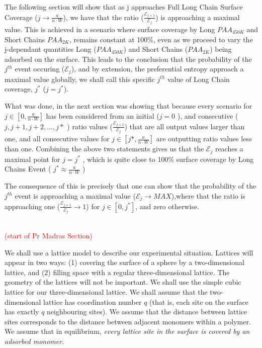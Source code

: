\documentclass[journal=jacsat,manuscript=article]{achemso}
\begin{document}
The following section will show that as j approaches Full Long Chain Surface Coverage ($j\to \frac{a}{n\cdot W}$), we have that the ratio ($\frac{\mathcal{E}_{j+1}}{\mathcal{E}_{j}}$) is approaching a maximal value. This is achieved in a scenario where surface coverage by Long $PAA_{450K}$ and Short Chains $PAA_{2K}$, remains constant at 100\%, even as we proceed to vary the j-dependant quantities Long ($PAA_{450K}$) and Short Chains ($PAA_{2K}$) being adsorbed on the surface. This leads to the conclusion that the probability of the $j^{th}$ event occuring ($\mathcal{E}_{j}$), and by extension, the preferential entropy approach a maximal value globally, we shall call this specific $j^{th}$ value of Long Chain coverage, $j^*$ ($j=j^{*}$). 

What was done, in the next section was showing that because every scenario for $j\in[0,\frac{a}{n\cdot W}]$ has been considered from an initial ($j = 0$ ), and consecutive ($j,j+1,j+2,...,j*$ ) ratio values ($\frac{\mathcal{E}_{j+1}}{\mathcal{E}_{j}}$) that are all output values larger than one, and all consecutive values for $j\in[j*,\frac{a}{n \cdot W}]$ are outputting ratio values less than one. Combining the above two statements gives us that the $\mathcal{E}_j$ reaches a maximal point for $j=j^*$ , which is quite close to 100\% surface coverage by Long Chains Event ( $j^*\approx \frac{a}{n\cdot W}$ ) %

The consequence of this is precisely that one can show that the probability of the $j^{th}$ event is approaching a maximal value (${\mathcal{E}_{j}} \to MAX$),where that the ratio is approaching one ($\frac{\mathcal{E}_{j+1}}{\mathcal{E}_{j}}\to 1$) for $j\in[0,j^*]$, and zero otherwise. %


\text{}\\
\textcolor{red}{(start of Pr Madras Section)}

We shall use a lattice model to describe our experimental situation.  
Lattices will appear in two ways:  (1) covering the surface of a sphere by a two-dimensional lattice, and
(2) filling space with a regular three-dimensional lattice.  
The geometry of the lattices will not be important.  We shall use the simple cubic lattice for our
three-dimensional lattice.  
We shall assume that the two-dimensional lattice has coordination number $q$ 
(that is, each site on the surface has exactly $q$ neighbouring sites).  We assume that 
the distance between lattice sites corresponds to the distance between adjacent monomers within a 
polymer.  We assume that in equilibrium, \textit{every lattice site in the surface is covered by an adsorbed 
monomer}.
\end{document}

